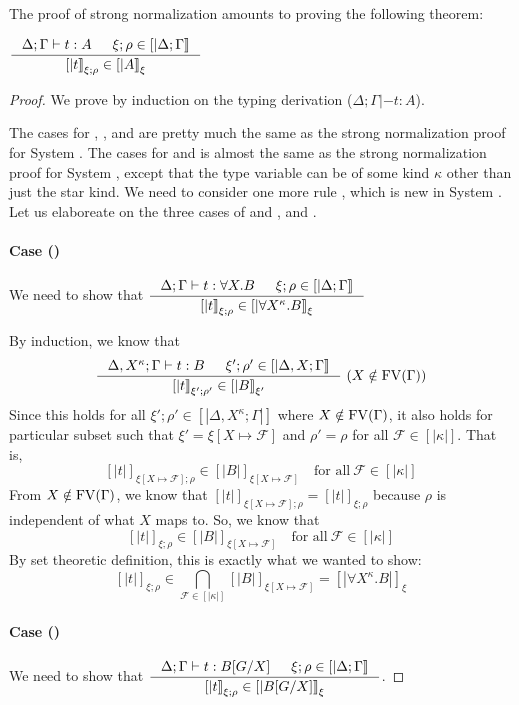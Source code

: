 The proof of strong normalization amounts to proving the following theorem:
\begin{theorem}
$ \inference{\Delta;\Gamma|- t:A & \xi;\rho \in [|\Delta;\Gamma|]}
            {[|t|]_{\xi;\rho} \in [|A|]_\xi} $
\end{theorem}
\begin{proof}
We prove by induction on the typing derivation ($\Delta;\Gamma |- t:A$).

The cases for , , and  are pretty
much the same as the strong normalization proof for System \F.
The cases for  and  is almost the same
as the strong normalization proof for System \F, except that the type variable
can be of some kind $\kappa$ other than just the star kind.
We need to consider one more rule , which is new in System \Fw.
Let us elaboreate on the three cases of
 and , and .

\paragraph{Case ()}
We need to show that
$ \inference{\Delta;\Gamma |- t : \forall X.B & \xi;\rho\in[|\Delta;\Gamma|]}
        {[|t|]_{\xi;\rho} \in [|\forall X^\kappa.B|]_\xi} $

By induction, we know that
\[ \inference{\Delta,X^\kappa;\Gamma |- t:B & \xi';\rho'\in[|\Delta,X;\Gamma|]}
        {[|t|]_{\xi';\rho'} \in [|B|]_{\xi'}} ~
        (X\notin\FV(\Gamma))
\]
Since this holds for all $\xi';\rho' \in [|\Delta,X^\kappa;\Gamma|]$ where
$X\notin\mathop{\mathrm{FV}}(\Gamma)$, it also holds for particular subset such that
$\xi' = \xi[X\mapsto\mathcal{F}]$ and $\rho'=\rho$ for all $\mathcal{F}\in[|\kappa|]$.
That is,
\[ [|t|]_{\xi[X\mapsto\mathcal{F}];\rho} \in [|B|]_{\xi[X\mapsto\mathcal{F}]}
        \quad \text{for all}~\mathcal{F}\in[|\kappa|] \]
From $X\notin\mathop{\mathrm{FV}}(\Gamma)$, we know that
$[|t|]_{\xi[X\mapsto\mathcal{F}];\rho} = [|t|]_{\xi;\rho}$
because $\rho$ is independent of what $X$ maps to.
So, we know that
\[ [|t|]_{\xi;\rho} \in [|B|]_{\xi[X\mapsto\mathcal{F}]}
        \quad \text{for all}~\mathcal{F}\in[|\kappa|] \]
By set theoretic definition, this is exactly what we wanted to show:
\[ [|t|]_{\xi;\rho} \in
        \bigcap_{\mathcal{F}\in[|\kappa|]} [|B|]_{\xi[X\mapsto\mathcal{F}]}
        = [|\forall X^\kappa.B|]_\xi
\]

\paragraph{Case ()}
We need to show that
$ \inference{\Delta;\Gamma |- t : B[G/X] & \xi;\rho\in[|\Delta;\Gamma|]}
        {[|t|]_{\xi;\rho} \in [|B[G/X]|]_\xi} $.


\end{proof}
